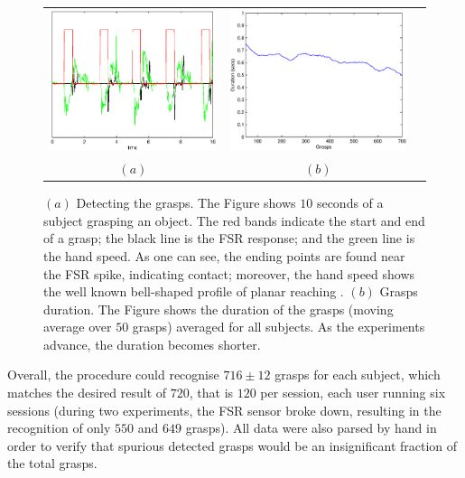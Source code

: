 \begin{figure}[htbp]
  \begin{center}
    \begin{tabular}{ccc}
      \includegraphics[width=0.48\linewidth]{grasp_seq_scotch.eps} &
      \includegraphics[width=0.48\linewidth]{grasp_trend.eps} \\
      $(a)$ & $(b)$
    \end{tabular}
    \caption{$(a)$ Detecting the grasps. The Figure shows $10$ seconds
    of a subject grasping an object. The red bands indicate the start
    and end of a grasp; the black line is the FSR response; and the
    green line is the hand speed. As one can see, the ending points
    are found near the FSR spike, indicating contact; moreover, the
    hand speed shows the well known bell-shaped profile of planar
    reaching \cite{morasso-81}. 
    $(b)$ Grasps duration. The Figure shows the duration of the
    grasps (moving average over $50$ grasps) averaged for all
    subjects. As the experiments advance, the duration becomes shorter.}
    \label{fig:grasp_sequence}
  \end{center}
\end{figure}

Overall, the procedure could recognise $716 \pm 12$ grasps for each
subject, which matches the desired result of $720$, that is $120$ per
session, each user running six sessions (during two experiments, the
FSR sensor broke down, resulting in the recognition of only $550$ and
$649$ grasps). All data were also parsed by hand in order to verify
that spurious detected grasps would be an insignificant fraction of
the total grasps.

